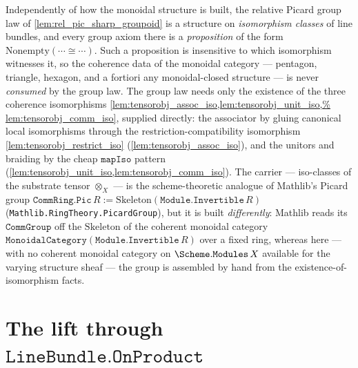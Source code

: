 \begin{remark}
  Independently of how the monoidal structure is built, the relative Picard
  group law of \cref{lem:rel_pic_sharp_groupoid} is a structure on
  \emph{isomorphism classes} of line bundles, and every group axiom there is a
  \emph{proposition} of the form \(\mathrm{Nonempty}(\cdots \cong \cdots)\).
  Such a proposition is insensitive to which isomorphism witnesses it, so the
  coherence data of the monoidal category --- pentagon, triangle, hexagon, and
  a fortiori any monoidal-closed structure --- is never \emph{consumed} by the
  group law. The group law needs only the existence of the three coherence
  isomorphisms \cref{lem:tensorobj_assoc_iso,lem:tensorobj_unit_iso,%
  lem:tensorobj_comm_iso}, supplied directly: the associator by gluing canonical
  local isomorphisms through the restriction-compatibility isomorphism
  \cref{lem:tensorobj_restrict_iso} (\cref{lem:tensorobj_assoc_iso}), and the
  unitors and braiding by the cheap \(\mathtt{mapIso}\) pattern
  (\cref{lem:tensorobj_unit_iso,lem:tensorobj_comm_iso}). The carrier --- iso-classes
  of the substrate tensor \(\otimes_X\) --- is the scheme-theoretic analogue of
  Mathlib's Picard group \(\mathtt{CommRing.Pic}\,R := \mathrm{Skeleton}(
  \mathtt{Module.Invertible}\,R)\) (\texttt{Mathlib.RingTheory.PicardGroup}), but it
  is built \emph{differently}: Mathlib reads its \(\mathtt{CommGroup}\) off the
  \(\mathrm{Skeleton}\) of the coherent monoidal category
  \(\mathtt{MonoidalCategory}(\mathtt{Module.Invertible}\,R)\) over a fixed ring,
  whereas here --- with no coherent monoidal category on
  \(\Scheme.\mathtt{Modules}\,X\) available for the varying structure sheaf --- the
  group is assembled by hand from the existence-of-isomorphism facts.
\end{remark}

\section{The lift through \(\texttt{LineBundle.OnProduct}\)}
\label{sec:tensorobj_onproduct_lift}

